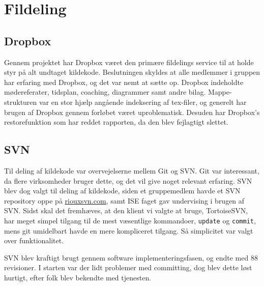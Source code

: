 \section{Fildeling}

\subsection{Dropbox}

Gennem projektet har Dropbox været den primære fildelings service til at holde styr på alt undtaget kildekode. Beslutningen skyldes at alle medlemmer i gruppen har erfaring med Dropbox, og det var nemt at sætte op. Dropbox indeholdte mødereferater, tidsplan, coaching, diagrammer samt andre bilag. 
Mappe-strukturen var en stor hjælp angående indeksering af tex-filer, og generelt har brugen af Dropbox gennem forløbet været uproblematisk. Desuden har Dropbox's restorefunktion som har reddet rapporten, da den blev fejlagtigt slettet.

\subsection{SVN}

Til deling af kildekode var overvejelserne mellem Git og SVN. Git var interessant, da flere virksomheder bruger dette, og det vil give noget relevant erfaring. SVN blev dog valgt til deling af kildekode, siden et gruppemedlem havde et SVN repository oppe på \url{riouxsvn.com}, samt ISE faget gav undervising i brugen af SVN. Sidst skal det fremhæves, at den klient vi valgte at bruge, TortoiseSVN\cite{lib:Tortoise}, har meget simpel tilgang til de mest væsentlige kommandoer, \texttt{update} og \texttt{commit}, mens git umidelbart havde en mere kompliceret tilgang. Så simplicitet var valgt over funktionalitet.

SVN blev kraftigt brugt gennem software implementeringsfasen, og endte med 88 revisioner. I starten var der lidt problemer med committing, dog blev dette løst hurtigt, efter folk blev bekendte med tjenesten.